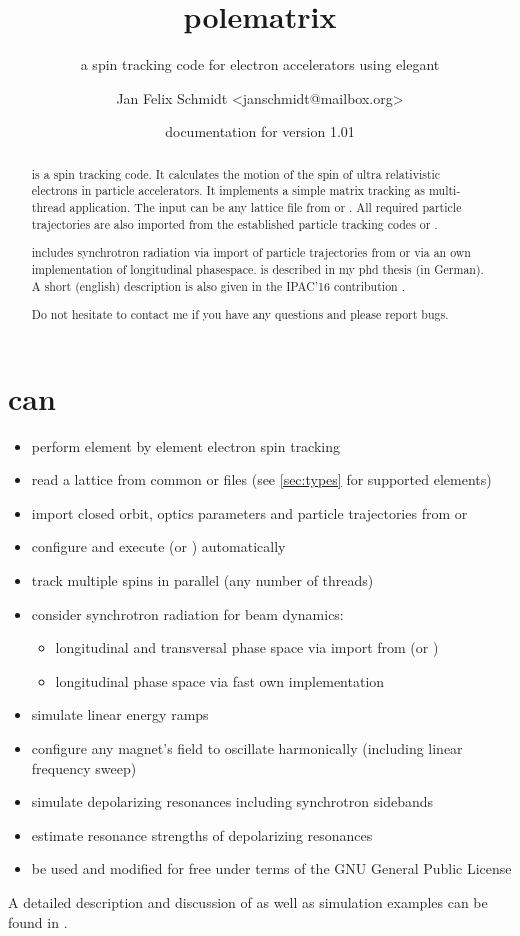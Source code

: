 \documentclass[a4paper]{scrartcl}
\author{Jan Felix Schmidt \textless janschmidt@mailbox.org\textgreater}
\title{polematrix}
\subtitle{a spin tracking code for electron accelerators using elegant}
\date{documentation for version 1.01}
\begin{document}
\maketitle

\begin{abstract}
  \polem is a spin tracking code. It calculates the motion of the spin of ultra
  relativistic electrons in particle accelerators. It implements a simple matrix tracking
  as multi-thread \cpp application. The input can be any lattice file from \ele or
  \madx. All required particle trajectories are also imported from the established
  particle tracking codes \ele or \madx.

  \polem includes synchrotron radiation via import of particle trajectories from \ele or
  via an own implementation of longitudinal phasespace. \polem is described in my phd
  thesis \cite{dr} (in German). A short (english) description is also given in the IPAC'16
  contribution \cite{IPAC16-decoh}.
  
  Do not hesitate to contact me if you have any questions and please report bugs.
\end{abstract}

\tableofcontents
\clearpage


\section{\polem can}
\label{sec:polem-can}

\begin{itemize}
\item perform element by element electron spin tracking
\item read a lattice from common \ele or \madx files (see \cref{sec:types} for supported elements)
\item import closed orbit, optics parameters and particle trajectories from \ele or
  \madx
\item configure and execute \ele (or \madx) automatically
\item track multiple spins in parallel (any number of threads)

\item consider synchrotron radiation for beam dynamics:
  \begin{itemize}
  \item longitudinal and transversal phase space via import from \ele (or \madx)
  \item longitudinal phase space via fast own implementation
  \end{itemize}
\item simulate linear energy ramps
\item configure any magnet's field to oscillate harmonically (including linear frequency sweep)
\item simulate depolarizing resonances including synchrotron sidebands
\item estimate resonance strengths of depolarizing resonances
\item be used and modified for free under terms of the GNU General Public License
\end{itemize}
A detailed description and discussion of \polem as well as simulation examples can be
found in \cite{dr}.
\end{document}
